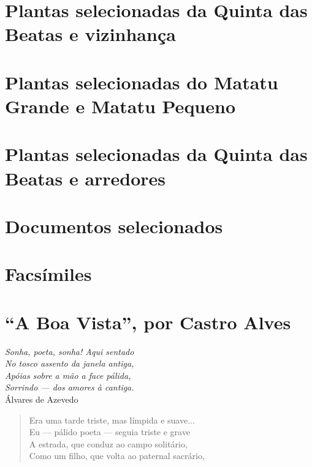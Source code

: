 \begin{anexosenv}
\chapter{Plantas selecionadas da Quinta das Beatas e vizinhança}




\chapter{Plantas selecionadas do Matatu Grande e Matatu Pequeno}




\chapter{Plantas selecionadas da Quinta das Beatas e arredores}








\chapter{Documentos selecionados}




\chapter{Facsímiles}


\chapter{``A Boa Vista'', por Castro Alves}\label{cap:boavista}

\settowidth{\versewidth}{}

\begin{flushright}
\textit{Sonha, poeta, sonha! Aqui sentado \\
No tosco assento da janela antiga,\\
Apóias sobre a mão a face pálida,\\
Sorrindo — dos amores à cantiga.}\\
Álvares de Azevedo
\end{flushright}

\begin{verse}
Era uma tarde triste, mas límpida e suave... \\
Eu — pálido poeta — seguia triste e grave \\
A estrada, que conduz ao campo solitário, \\
Como um filho, que volta ao paternal sacrário, \\
\end{verse}


\end{anexosenv}
